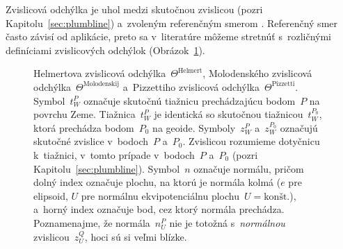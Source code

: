 \documentclass[a4paper, 12pt]{book}
\begin{document}
Zvislicová odchýlka je uhol medzi skutočnou zvislicou (pozri 
Kapitolu~\ref{sec:plumbline}) a~zvoleným referenčným smerom 
\parencite{TorgeGeodesy}.  Referenčný smer často závisí od aplikácie, preto sa 
v~literatúre môžeme stretnúť s~rozličnými definíciami zvislicových odchýlok 
(Obrázok~\ref{fig:deflections}).

\begin{figure}[bt]
\centering

\caption{Helmertova zvislicová odchýlka~$\Theta^\textrm{Helmert}$, Molodenského 
zvislicová odchýlka~$\Theta^\textrm{Molodenskij}$ a~Pizzettiho zvislicová 
odchýlka~$\Theta^\textrm{Pizzetti}$.  Symbol~$t_W^P$ označuje skutočnú tiažnicu 
prechádzajúcu bodom~$P$ na povrchu Zeme.  Tiažnica~$t_W^P$ je identická so 
skutočnou tiažnicou~$t_W^{P_0}$, ktorá prechádza bodom~$P_0$ na geoide.  
Symboly~$z_W^P$ a~$z_W^{P_0}$ označujú skutočné zvislice v~bodoch~$P$ a~$P_0$.  
Zvislicou rozumieme dotyčnicu k~tiažnici, v~tomto prípade v~bodoch~$P$ a~$P_0$ 
(pozri Kapitolu~\ref{sec:plumbline}).  Symbol~$n$ označuje normálu, pričom 
dolný index označuje plochu, na ktorú je normála kolmá ($e$ pre elipsoid, $U$ 
pre normálnu ekvipotenciálnu plochu~$U = \textrm{kon\v{s}t.}$), a~horný index 
označuje bod, cez ktorý normála prechádza.  Poznamenajme, že normála~$n_U^P$ 
nie je totožná s~\emph{normálnou} zvislicou~$z_U^Q$, hoci sú si veľmi blízke.}
\label{fig:deflections}
\end{figure}
\end{document}

